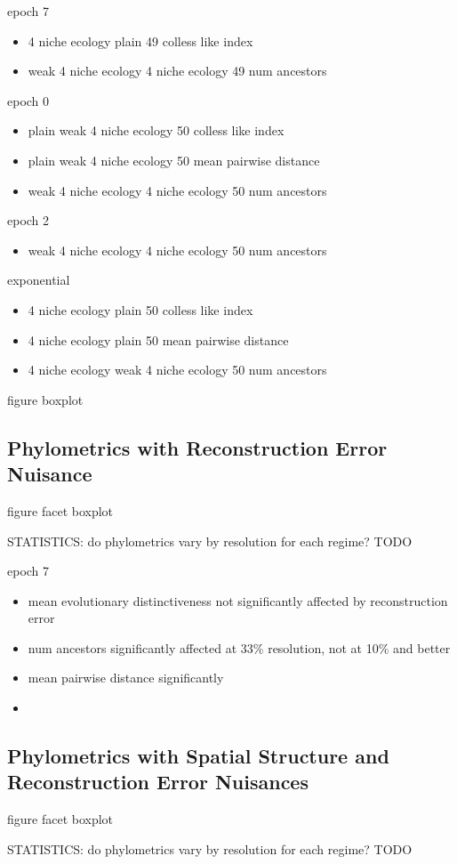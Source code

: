 epoch 7
\begin{itemize}
    \item 4 niche ecology	plain	49	colless like index
\item weak 4 niche ecology	4 niche ecology	49	num ancestors
\end{itemize}

epoch 0
\begin{itemize}

\item plain	weak 4 niche ecology	50	colless like index
\item plain	weak 4 niche ecology	50	mean pairwise distance
\item weak 4 niche ecology	4 niche ecology	50	num ancestors

\end{itemize}

epoch 2
\begin{itemize}
    \item weak 4 niche ecology	4 niche ecology	50	num ancestors
\end{itemize}

exponential
\begin{itemize}
    \item 4 niche ecology	plain	50	colless like index
    \item 4 niche ecology	plain	50	mean pairwise distance
    \item 4 niche ecology	weak 4 niche ecology	50	num ancestors
\end{itemize}

figure boxplot


\subsection{Phylometrics with Reconstruction Error Nuisance}



figure facet boxplot

STATISTICS: do phylometrics vary by resolution for each regime?
TODO

epoch 7
\begin{itemize}
    \item mean evolutionary distinctiveness not significantly affected by reconstruction error
    \item num ancestors significantly affected at 33\% resolution, not at 10\% and better
    \item mean pairwise distance significantly 
    \item 
\end{itemize}

\subsection{Phylometrics with Spatial Structure and Reconstruction Error Nuisances}

figure facet boxplot


STATISTICS: do phylometrics vary by resolution for each regime?
TODO
